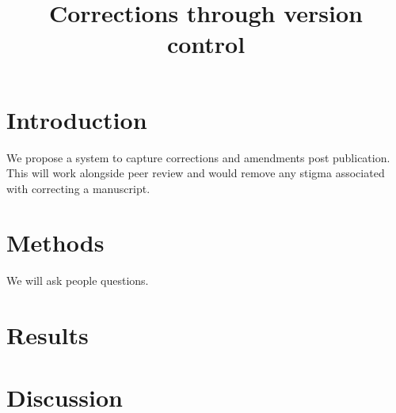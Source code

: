 \documentclass{article}
\begin{document}
\title{Corrections through version control}
\begin{titlepage}
\maketitle
\end{titlepage}






\section{Introduction}
We propose a system to capture corrections and amendments post publication. This will work alongside peer review and would remove any stigma associated with correcting a manuscript. 

\vspace{5mm}

\section{Methods}
We will ask people questions. 

\vspace{5mm}

\section{Results}

\vspace{5mm}

\section{Discussion}
\end{document}
